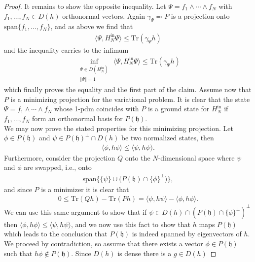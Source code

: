 \begin{proof}
	It remains to show the opposite inequality. Let $\Psi = f_1\wedge\cdots\wedge f_N$
	with $f_1,\ldots,f_N\in D(h)$ orthonormal vectors. Again $\gamma_\Psi \eqcolon P$ is a
	projection onto $\mathrm{span}\{f_1,\ldots,f_N\}$, and as above we find that
	\begin{align*}
		\langle\Psi,H_N^{\mathrm{in}}\Psi\rangle \leq \mathrm{Tr}(\gamma_\Psi h)
	\end{align*}
	and the inequality carries to the infimum
	\begin{align*}
		\inf_{\substack{\Psi\in D(H_N^{\mathrm{in}})\\\Vert\Psi\Vert=1}}\,
		\langle\Psi,H_N^{\mathrm{in}}\Psi\rangle \leq \mathrm{Tr}(\gamma_\Psi h)
	\end{align*}
	which finally proves the equality and the first part of the claim. Assume now
	that $P$ is a minimizing projection for the variational problem. It is clear that the
	state $\Psi=f_1\wedge\cdots\wedge f_N$ whose 1-pdm coincides with $P$ is a ground state
	for $H_N^{\mathrm{in}}$ if $f_1,\ldots,f_N$ form an orthonormal basis for $P(\mathfrak{h})$.
	\\
	We may now prove the stated properties for this minimizing projection. Let $\phi\in P(
	\mathfrak{h})$ and $\psi\in P(\mathfrak{h})^\perp\cap D(h)$ be two normalized states, then
	\begin{align*}
		\langle\phi,h\phi\rangle\leq\langle\psi,h\psi\rangle.
	\end{align*}
	Furthermore, consider the projection $Q$ onto the $N$-dimensional space where $\psi$ and $\phi$
	are swapped, i.e., onto
	\begin{align*}
		\mathrm{span}\bigg\{\{\psi\}\cup \big(P(\mathfrak{h})\cap\{\phi\}^\perp\big)\bigg\},
	\end{align*}
	and since $P$ is a minimizer it is clear that
	\begin{align*}
		0\leq\mathrm{Tr}(Qh)-\mathrm{Tr}(Ph) = \langle\psi,h\psi\rangle-\langle\phi,h\phi\rangle.
	\end{align*}
	We can use this same argument to show that if $\psi\in D(h)\cap (P(\mathfrak{h})\cap
	\{\phi\}^\perp)^\perp$ then $\langle\phi,h\phi\rangle\leq\langle\psi,h\psi\rangle$, and we
	now use this fact to show that $h$ maps $P(\mathfrak{h})$ which leads to the conclusion
	that $P(\mathfrak{h})$ is indeed spanned by eigenvectors of $h$.
	\\
	We proceed by contradiction, so assume that there exists a vector $\phi\in P(\mathfrak{h})$
	such that $h\phi\not\in P(\mathfrak{h})$. Since $D(h)$ is dense there is a $g\in D(h)$

\end{proof}
